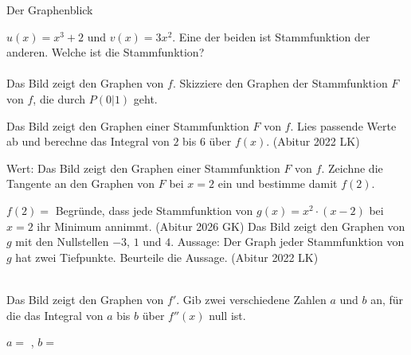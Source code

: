 \setcounter{aufgabe}{12}

\begin{aufgabe}{Der Graphenblick}
\begin{teile}
\teil $u(x) = x^3 + 2$ und $v(x) = 3x^2$. Eine der beiden ist Stammfunktion der anderen. Welche ist die Stammfunktion? \\  \\ 
\teil Das Bild zeigt den Graphen von $f$. Skizziere den Graphen der Stammfunktion $F$ von $f$, die durch $P(0 | 1)$ geht.

\begin{ksys}[xmin=-2,xmax=4,ymin=-3,ymax=4]   \end{ksys}
\teil Das Bild zeigt den Graphen einer Stammfunktion $F$ von $f$. Lies passende Werte ab und berechne das Integral von $2$ bis $6$ über $f(x)$. \hfill (Abitur 2022 LK) \\

\begin{ksys}[xmin=0,xmax=8,ymin=-2,ymax=6,ablesen]  \end{ksys}
Wert: \leerfeld
\teil Das Bild zeigt den Graphen einer Stammfunktion $F$ von $f$. Zeichne die Tangente an den Graphen von $F$ bei $x = 2$ ein und bestimme damit $f(2)$.

\begin{ksys}[xmin=-2,xmax=4,ymin=-2,ymax=4]  \end{ksys}
$f(2) = $ \leerfeld
\teil Begründe, dass jede Stammfunktion von $g(x) = x^2 \cdot (x - 2)$ bei $x = 2$ ihr Minimum annimmt. \hfill (Abitur 2026 GK)
\teil Das Bild zeigt den Graphen von $g$ mit den Nullstellen $-3$, $1$ und $4$. Aussage: Der Graph jeder Stammfunktion von $g$ hat zwei Tiefpunkte. Beurteile die Aussage. \hfill (Abitur 2022 LK) \\  \\ 

\begin{ksys}[xmin=-4,xmax=5,ymin=-5,ymax=6,ablesen]  \end{ksys}
\teil Das Bild zeigt den Graphen von $f'$. Gib zwei verschiedene Zahlen $a$ und $b$ an, für die das Integral von $a$ bis $b$ über $f''(x)$ null ist.

\begin{ksys}[xmin=-3,xmax=5,ymin=-3,ymax=4,ablesen]  \end{ksys}
$a = $ \leerfeld , $b = $ \leerfeld
\end{teile}
\end{aufgabe}
